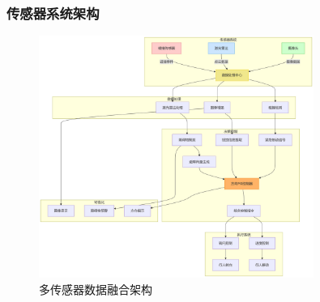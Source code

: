 \subsubsection{传感器系统架构}
\begin{figure}[H]
    \centering
    \includegraphics[width=0.8\textwidth]{images/sensor_architecture.pdf}
    \caption{多传感器数据融合架构}
    \label{fig:sensor}
\end{figure}


